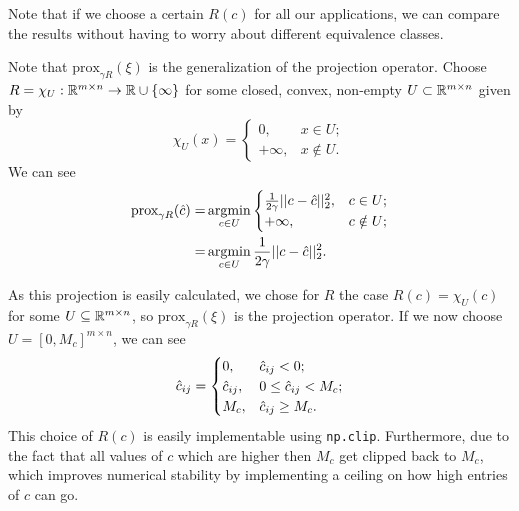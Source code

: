 Note that if we choose a certain $R(c)$ for all our applications, we can compare the results without having to worry about different equivalence classes. \par
\vspace{0.3cm}
\begin{remark}
	Note that $\text{prox}_{\gamma R}(\xi)$ is the generalization of the projection operator. Choose $R = \chi_U: \mathbb{R}^{m \times n} \rightarrow \mathbb{R} \cup \{\infty\}$ for some closed, convex, non-empty $U \subset \mathbb{R}^{m \times n}$ given by 
	\[\chi_U (x) = \begin{cases}
		0, & x \in U; \\
		+\infty, & x \notin U.
	\end{cases}\]
	We can see 
	\begin{align*}
		\text{prox}_{\gamma R}(\hat{c}) = & \operatorname*{argmin}_{c\in U} \begin{cases}
			\frac{1}{2\gamma} ||c-\hat{c}||^2_2, & c \in U; \\
			+\infty, & c \notin U;
		\end{cases}
		\\ 
		= & \operatorname*{argmin}_{c \in U} \frac{1}{2\gamma} ||c-\hat{c}||^2_2.
	\end{align*}
	\label{rem:proj}
\end{remark}
As this projection is easily calculated, we chose for $R$ the case $R(c) = \chi_U(c)$ for some $U \subseteq \mathbb{R}^{m\times n}$, so $\text{prox}_{\gamma R}(\xi)$ is the projection operator. If we now choose $U = [0, M_c]^{m \times n}$, we can see 
\[\hat{c}_{ij} = \begin{cases}
	0, & \hat{c}_{ij} < 0; \\
	\hat{c}_{ij}, & 0 \leq \hat{c}_{ij} < M_c; \\
	M_c, & \hat{c}_{ij} \geq M_c.
\end{cases}\]
This choice of $R(c)$ is easily implementable using \lstinline|np.clip|. Furthermore, due to the fact that all values of $c$ which are higher then $M_c$ get clipped back to $M_c$, which improves numerical stability by implementing a ceiling on how high entries of $c$ can go. 













